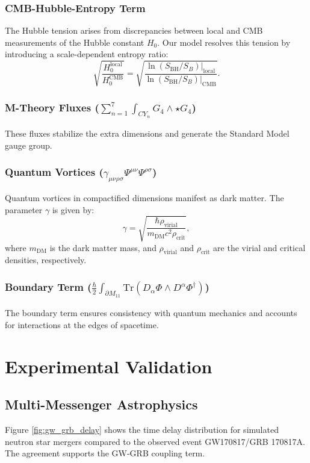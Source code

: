 \documentclass[12pt,a4paper]{article}
\begin{document}
\subsubsection{CMB-Hubble-Entropy Term}
The Hubble tension arises from discrepancies between local and CMB measurements of the Hubble constant $H_0$. Our model resolves this tension by introducing a scale-dependent entropy ratio:
\[
\sqrt{\frac{H_0^{\text{local}}}{H_0^{\text{CMB}}}} = \sqrt{\frac{\ln(S_{\text{BH}}/S_B)|_{\text{local}}}{\ln(S_{\text{BH}}/S_B)|_{\text{CMB}}}}.
\]

\subsubsection{M-Theory Fluxes ($\sum_{n=1}^7 \int_{CY_n} G_4 \wedge \star G_4$)}
These fluxes stabilize the extra dimensions and generate the Standard Model gauge group.

\subsubsection{Quantum Vortices ($\gamma_{\mu\nu\rho\sigma} \Psi^{\mu\nu} \Psi^{\rho\sigma}$)}
Quantum vortices in compactified dimensions manifest as dark matter. The parameter $\gamma$ is given by:
\[
\gamma = \sqrt{\frac{\hbar \rho_{\text{virial}}}{m_{\text{DM}} c^2 \rho_{\text{crit}}}},
\]
where $m_{\text{DM}}$ is the dark matter mass, and $\rho_{\text{virial}}$ and $\rho_{\text{crit}}$ are the virial and critical densities, respectively.

\subsubsection{Boundary Term ($\frac{\hbar}{2} \int_{\partial M_{11}} \text{Tr}(D_\alpha \Phi \wedge D^\alpha \Phi^\dagger)$)}
The boundary term ensures consistency with quantum mechanics and accounts for interactions at the edges of spacetime.

\section{Experimental Validation}
\subsection{Multi-Messenger Astrophysics}
Figure \ref{fig:gw_grb_delay} shows the time delay distribution for simulated neutron star mergers compared to the observed event GW170817/GRB 170817A. The agreement supports the GW-GRB coupling term.
\end{document}

